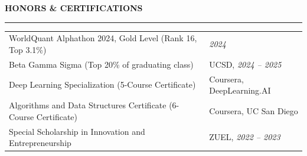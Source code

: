 \documentclass{../original_CV/resume}
\renewcommand{\sectionskip}{\vspace{0.10cm}}
\renewcommand{\sectionlineskip}{\vspace{0.10cm}}
\renewenvironment{rSection}[1]{
\sectionskip
\textcolor{UC San Diego Blue}{\textbf{\large\bfseries\MakeUppercase{#1}}}
\sectionlineskip
\hrule
\begin{list}{}{\setlength{\leftmargin}{0em}}
\item[]
}{\end{list}}
\begin{document}
\begin{rSection}{HONORS \& CERTIFICATIONS}
\begin{tabularx}{\textwidth}{@{} >{\raggedright\arraybackslash}X >{\raggedleft\arraybackslash\hyphenpenalty=10000\exhyphenpenalty=10000}p{4.8cm} @{}}
WorldQuant Alphathon 2024, Gold Level (Rank 16, Top 3.1\%) & {\em 2024} \\
Beta Gamma Sigma (Top 20\% of graduating class) & UCSD, {\em 2024 -- 2025} \\
Deep Learning Specialization (5-Course Certificate) & Coursera, DeepLearning.AI \\
Algorithms and Data Structures Certificate (6-Course Certificate) & Coursera, UC San Diego \\
Special Scholarship in Innovation and Entrepreneurship & ZUEL, {\em 2022 -- 2023}
\end{tabularx}
\end{rSection}
\end{document}
